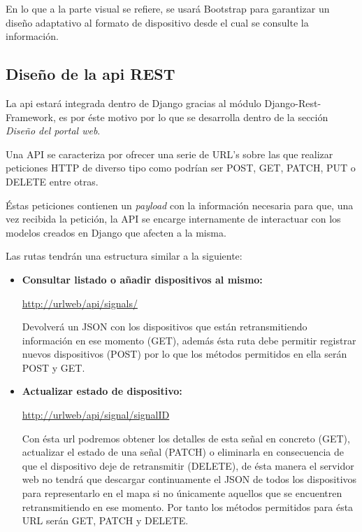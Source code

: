 En lo que a la parte visual se refiere, se usará Bootstrap para garantizar un diseño adaptativo al formato de dispositivo desde el cual se consulte la información.

\subsection{Diseño de la api REST}

La api estará integrada dentro de Django gracias al módulo Django-Rest-Framework, es por éste motivo por lo que se desarrolla dentro de la sección \textit{Diseño del portal web}.

\bigskip

Una API se caracteriza por ofrecer una serie de URL's sobre las que realizar peticiones HTTP de diverso tipo como podrían ser POST, GET, PATCH, PUT o DELETE entre otras.

Éstas peticiones contienen un \textit{payload} con la información necesaria para que, una vez recibida la petición, la API se encarge internamente de interactuar con los modelos creados en Django que afecten a la misma.

\bigskip

Las rutas tendrán una estructura similar a la siguiente:

\begin{itemize}
  \item \textbf{Consultar listado o añadir dispositivos al mismo:}

  \url{http://urlweb/api/signals/}

  Devolverá un JSON con los dispositivos que están retransmitiendo información en ese momento (GET), además ésta ruta debe permitir registrar nuevos dispositivos (POST) por lo que los métodos permitidos en ella serán POST y GET.

  \item \textbf{Actualizar estado de dispositivo:}

  \url{http://urlweb/api/signal/signalID}

  Con ésta url podremos obtener los detalles de esta señal en concreto (GET), actualizar el estado de una señal (PATCH) o eliminarla en consecuencia de que el dispositivo deje de retransmitir (DELETE), de ésta manera el servidor web no tendrá que descargar continuamente el JSON de todos los dispositivos para representarlo en el mapa si no únicamente aquellos que se encuentren retransmitiendo en ese momento. Por tanto los métodos permitidos para ésta URL serán GET, PATCH y DELETE.
\end{itemize}
